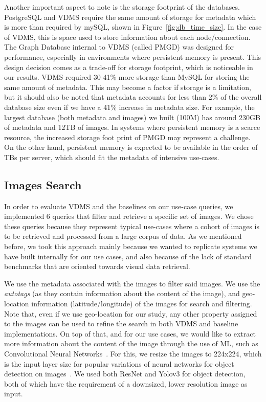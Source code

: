 Another important aspect to note is the storage footprint of the databases.
PostgreSQL and VDMS require the same amount of storage for metadata which
is more than required by mySQL, shown in Figure~\ref{fig:db_time_size}.
In the case of VDMS, this is space used to store information about
each node/connection.
The Graph Database internal to VDMS (called PMGD) was designed for performance,
especially in environments where persistent memory is present.
This design decision comes as a trade-off for storage footprint, which is
noticeable in our results.
VDMS required 30-41\% more storage than MySQL for storing the same amount
of metadata.
This may become a factor if storage is a limitation, but it should also be noted
that metadata accounts for less than 2\% of the overall database size
even if we have a 41\% increase in metadata size.
For example, the largest database (both metadata and images) we built
(100M) has around 230GB of metadata and 12TB of images.
In systems where persistent memory is a scarce resource,
the increased storage foot print of PMGD may represent a challenge.
On the other hand, persistent memory is expected to be available
in the order of TBs per server, which should fit the
metadata of intensive use-cases\cite{IntelXPoint15}.


\subsection{Images Search}
\label{images}

In order to evaluate VDMS and the baselines on our use-case queries,
we implemented 6 queries that filter and retrieve a specific set of images.
We chose these queries because they represent typical use-cases where a
cohort of images is to be retrieved and processed from a large corpus of data.
As we mentioned before, we took this approach mainly because we wanted to
replicate systems we have built internally for our use cases,
and also because of the lack of standard
benchmarks that are oriented towards visual data retrieval.

We use the metadata associated with the images to filter said images.
We use the \textit{autotags} (as they contain information about the content
of the image), and geo-location information (latitude/longitude)
of the images for search and filtering.
Note that, even if we use geo-location for our study, any other property
assigned to the images can be used to refine the search
in both VDMS and baseline implementations.
On top of that, and for our use cases, we would like to extract more information
about the content of the image through the use of ML,
such as Convolutional Neural Networks~\cite{cnn}.
For this, we resize the images to 224x224, which is the input layer size for
popular variations of neural networks for object detection on images~\cite{resnet}.
We used both ResNet and Yolov3 for object detection, both of which
have the requirement of a downsized, lower resolution image as input.

